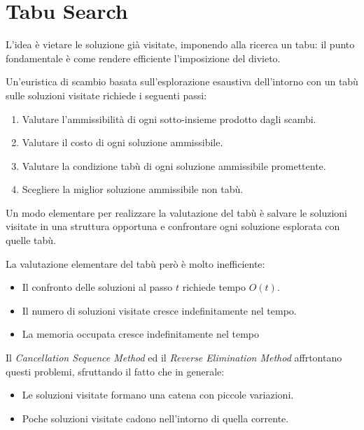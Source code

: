 \documentclass[\main/main.tex]{subfiles}
\begin{document}
\clearpage
\section{Tabu Search}
\begin{multicols}{2}
\begin{observation}
    L'idea è vietare le soluzione già visitate, imponendo alla ricerca un tabu: il punto fondamentale è come rendere efficiente l'imposizione del divieto.
\end{observation}
\begin{definition}
    Un'euristica di scambio basata sull'esplorazione esaustiva dell'intorno con un tabù sulle soluzioni visitate richiede i seguenti passi:
    \begin{enumerate}
        \item Valutare l'ammissibilità di ogni sotto-insieme prodotto dagli scambi.
        \item Valutare il costo di ogni soluzione ammissibile.
        \item Valutare la condizione tabù di ogni soluzione ammissibile promettente.
        \item Scegliere la miglior soluzione ammissibile non tabù.
    \end{enumerate}
\end{definition}
\begin{definition}
    Un modo elementare per realizzare la valutazione del tabù è salvare le soluzioni visitate in una struttura opportuna e confrontare ogni soluzione esplorata con quelle tabù.
\end{definition}
\begin{observation}
    La valutazione elementare del tabù però è molto inefficiente:
    \begin{itemize}
        \item Il confronto delle soluzioni al passo \(t\) richiede tempo \(O(t)\).
        \item Il numero di soluzioni visitate cresce indefinitamente nel tempo.
        \item La memoria occupata cresce indefinitamente nel tempo
    \end{itemize}
\end{observation}
\begin{observation}
    Il \textit{Cancellation Sequence Method} ed il \textit{Reverse Elimination Method} affrtontano questi problemi, sfruttando il fatto che in generale:
    \begin{itemize}
        \item Le soluzioni visitate formano una catena con piccole variazioni.
        \item Poche soluzioni visitate cadono nell'intorno di quella corrente.
    \end{itemize}
    

\end{observation}
\end{multicols}
\end{document}
